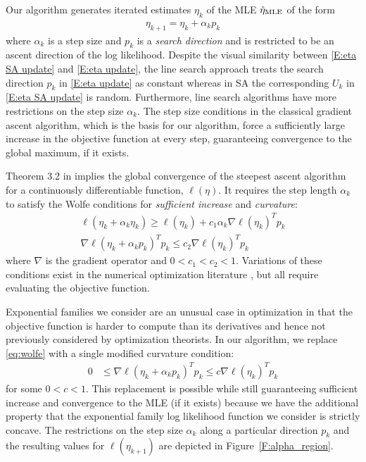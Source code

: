 Our algorithm generates iterated estimates $\eta_k$ of the MLE $\hat{\eta}_{\textrm{MLE}}$ of the 
form 
\begin{align} \label{E:eta update}
	\eta_{k+1} = \eta_k + \alpha_k p_k
\end{align}
where $\alpha_k$ is a step size and $p_k$ is a \emph{search direction} and is 
restricted to be an ascent direction of 
the log likelihood.  
Despite the visual similarity between \eqref{E:eta SA update} and \eqref{E:eta 
update}, the line search approach treats 
the search direction $p_k$ in \eqref{E:eta update} as constant whereas in SA the 
corresponding $U_k$ in \eqref{E:eta SA update} is random.
Furthermore, line search algorithms have more restrictions on the step size $\alpha_k$.  
The step size 
conditions in the classical gradient ascent algorithm, which is the basis for our 
algorithm, force  a sufficiently 
large increase in the objective function at every step, guaranteeing convergence to 
the global maximum, if it exists.

Theorem 3.2 in \citep{NW} implies the global convergence of the steepest ascent 
algorithm for a continuously differentiable function, $\ell(\eta)$.  It requires the 
step length $\alpha_k$ to satisfy 
the Wolfe conditions for \emph{sufficient increase} and \emph{curvature}:
\begin{equation} \label{eq:wolfe}
\begin{split}
	\ell(\eta_k + \alpha_k \eta_k) \geq \ell(\eta_k) + c_1 \alpha_k \nabla \ell (\eta_k)^T p_k \\
	\nabla \ell( \eta_k + \alpha_k p_k)^T p_k \leq c_2 \nabla \ell( \eta_k)^T p_k
\end{split}
\end{equation}
where $\nabla$ is the gradient operator and $0 < c_1 < c_2 < 1$.   
Variations of these conditions exist in the numerical optimization literature \citep
{Fletcher,NW,Sun:2006}, but all 
require evaluating the objective function.

Exponential families we consider are an unusual case in optimization in that the 
objective function 
is harder to compute than its derivatives and hence not previously considered by 
optimization theorists.
In our algorithm, we replace \eqref{eq:wolfe} with a single modified curvature 
condition:
\begin{align} \label{E:curvature mod}
	 0 & \leq \nabla \ell( \eta_k + \alpha_k p_k)^T p_k \leq c \nabla \ell(\eta_k)^T p_k
\end{align}
for some $0 < c < 1$.  This replacement is possible while still guaranteeing 
sufficient increase and convergence to the MLE (if it exists) 
because we have the additional property that the exponential family log likelihood 
function we consider is strictly 
concave.  The restrictions on the step size $\alpha_k$ along a particular direction 
$p_k$ and the resulting values for 
$\ell(\eta_{k+1})$ are depicted in Figure~\ref{F:alpha_region}.  

